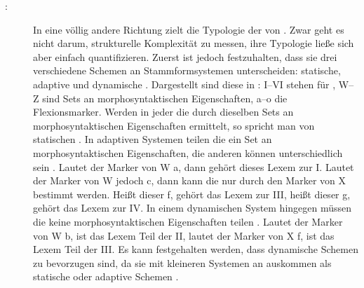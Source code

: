 \begin{exe}
\begin{exe}
\begin{description}
\item[:] In eine völlig andere Richtung zielt die Typologie der  von \citet{FinkelStump2007}. Zwar geht es nicht darum, strukturelle Komplexität zu messen, ihre Typologie ließe sich aber einfach quantifizieren. Zuerst ist jedoch festzuhalten, dass sie drei verschiedene Schemen an Stammformsystemen unterscheiden: statische, adaptive und dynamische . Dargestellt sind diese in : I–VI stehen für , W–Z sind Sets an morphosyntaktischen Eigenschaften, a–o die Flexionsmarker. Werden in jeder  die  durch dieselben Sets an morphosyntaktischen Eigenschaften ermittelt, so spricht man von statischen  \citep[2]{FinkelStump2007}. In adaptiven Systemen teilen die  ein Set an morphosyntaktischen Eigenschaften, die anderen können unterschiedlich sein \citep[2]{FinkelStump2007}. Lautet der Marker von W a, dann gehört dieses Lexem zur  I. Lautet der Marker von W jedoch c, dann kann die  nur durch den Marker von X bestimmt werden. Heißt dieser f, gehört das Lexem zur  III, heißt dieser g, gehört das Lexem zur  IV. In einem dynamischen System hingegen müssen die  keine morphosyntaktischen Eigenschaften teilen \citep[4]{FinkelStump2007}. Lautet der Marker von W b, ist das Lexem Teil der  II, lautet der Marker von X f, ist das Lexem Teil der  III. Es kann festgehalten werden, dass dynamische Schemen zu bevorzugen sind, da sie mit kleineren Systemen an  auskommen als statische oder adaptive Schemen \citep[4]{FinkelStump2007}.



\end{description}
\end{exe}
\end{exe}
